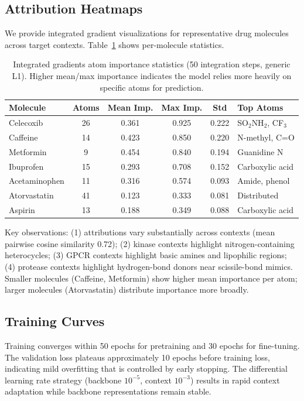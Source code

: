 \documentclass{article}
\begin{document}
\subsection{Attribution Heatmaps}

We provide integrated gradient visualizations for representative drug molecules across target contexts. Table~\ref{tab:attribution} shows per-molecule statistics.

\begin{table}[h]
\caption{Integrated gradients atom importance statistics (50 integration steps, generic L1). Higher mean/max importance indicates the model relies more heavily on specific atoms for prediction.}
\label{tab:attribution}
\centering
\small
\begin{tabular}{@{}lccccl@{}}
\toprule
Molecule & Atoms & Mean Imp. & Max Imp. & Std & Top Atoms \\
\midrule
Celecoxib & 26 & 0.361 & 0.925 & 0.222 & SO$_2$NH$_2$, CF$_3$ \\
Caffeine & 14 & 0.423 & 0.850 & 0.220 & N-methyl, C=O \\
Metformin & 9 & 0.454 & 0.840 & 0.194 & Guanidine N \\
Ibuprofen & 15 & 0.293 & 0.708 & 0.152 & Carboxylic acid \\
Acetaminophen & 11 & 0.316 & 0.574 & 0.093 & Amide, phenol \\
Atorvastatin & 41 & 0.123 & 0.333 & 0.081 & Distributed \\
Aspirin & 13 & 0.188 & 0.349 & 0.088 & Carboxylic acid \\
\bottomrule
\end{tabular}
\end{table}

Key observations: (1) attributions vary substantially across contexts (mean pairwise cosine similarity 0.72); (2) kinase contexts highlight nitrogen-containing heterocycles; (3) GPCR contexts highlight basic amines and lipophilic regions; (4) protease contexts highlight hydrogen-bond donors near scissile-bond mimics. Smaller molecules (Caffeine, Metformin) show higher mean importance per atom; larger molecules (Atorvastatin) distribute importance more broadly.

\subsection{Training Curves}

Training converges within 50 epochs for pretraining and 30 epochs for fine-tuning. The validation loss plateaus approximately 10 epochs before training loss, indicating mild overfitting that is controlled by early stopping. The differential learning rate strategy (backbone $10^{-5}$, context $10^{-3}$) results in rapid context adaptation while backbone representations remain stable.
\end{document}
